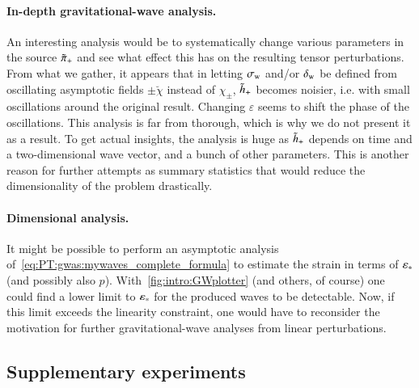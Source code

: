 \paragraph{In-depth gravitational-wave analysis.} %
An interesting analysis would be to systematically change various parameters in the source $\tilde{\pi}_+$ and see what effect this has on the resulting tensor perturbations. From what we gather, it appears that in letting $\sigma_\mathrm{w}$ and/or $\delta_\mathrm{w}$ be defined from oscillating asymptotic fields $\pm \breve{\chi}$ instead of $\chi_\pm$, $\tilde{h}_+$ becomes noisier, i.e. with small oscillations around the original result. Changing $\varepsilon$ seems to shift the phase of the oscillations. This analysis is far from thorough, which is why we do not present it as a result. To get actual insights, the analysis is huge as $\tilde{h}_+$ depends on time and a two-dimensional wave vector, and a bunch of other parameters. This is another reason for further attempts as summary statistics that would reduce the dimensionality of the problem drastically. 



\paragraph{Dimensional analysis.} %
It might be possible to perform an asymptotic analysis of~\cref{eq:PT:gwas:mywaves_complete_formula} to estimate the strain in terms of $\varepsilon_\ast$ (and possibly also $p$). With~\cref{fig:intro:GWplotter} (and others, of course) one could find a lower limit to $\varepsilon_\ast$ for the produced waves to be detectable. Now, if this limit exceeds the linearity constraint, one would have to reconsider the motivation for further gravitational-wave analyses from linear perturbations.



\subsection{Supplementary experiments}\label{sec:whatif:cont:extra_sims}





